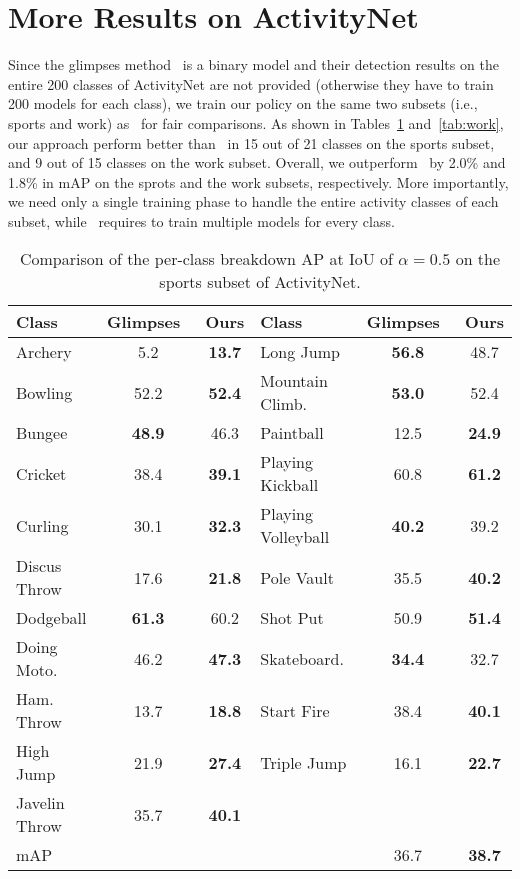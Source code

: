 \documentclass{bmvc2k}
\begin{document}
\section{More Results on ActivityNet}
\label{sec:results}

Since the glimpses method~\cite{yeung2015end} is a binary model and their detection results on the entire 200 classes of ActivityNet are not provided (otherwise they have to train 200 models for each class), we train our policy on the same two subsets (i.e., sports and work) as~\cite{yeung2015end} for fair comparisons. As shown in Tables~\ref{tab:sports} and~\ref{tab:work}, our approach perform better than~\cite{yeung2015end} in 15 out of 21 classes on the sports subset, and 9 out of 15 classes on the work subset. Overall, we outperform~\cite{yeung2015end} by 2.0\% and 1.8\% in mAP on the sprots and the work subsets, respectively. More importantly, we need only a single training phase to handle the entire activity classes of each subset, while~\cite{yeung2015end} requires to train multiple models for every class.

\begin{table}[thb]
\small
	\centering
	\begin{tabular}{lcclcc}
		\toprule
		Class & Glimpses~\cite{yeung2015end} & Ours & Class & Glimpses~\cite{yeung2015end} & Ours\\
		\midrule
		Archery & 5.2 & \textbf{13.7} & Long Jump & \textbf{56.8} & 48.7\\
		Bowling & 52.2 & \textbf{52.4} & Mountain Climb. & \textbf{53.0} & 52.4\\
        Bungee & \textbf{48.9} & 46.3 & Paintball & 12.5 & \textbf{24.9}\\
        Cricket & 38.4 & \textbf{39.1} & Playing Kickball & 60.8 & \textbf{61.2}\\
        Curling & 30.1 & \textbf{32.3} & Playing Volleyball & \textbf{40.2} & 39.2\\
        Discus Throw & 17.6 & \textbf{21.8} & Pole Vault & 35.5 & \textbf{40.2}\\
        Dodgeball & \textbf{61.3} & 60.2 & Shot Put & 50.9 & \textbf{51.4}\\
        Doing Moto. & 46.2 & \textbf{47.3} & Skateboard. & \textbf{34.4} & 32.7\\
		Ham. Throw & 13.7 & \textbf{18.8} & Start Fire & 38.4 & \textbf{40.1}\\
        High Jump & 21.9 & \textbf{27.4} & Triple Jump & 16.1 & \textbf{22.7}\\
        Javelin Throw & 35.7 & \textbf{40.1} & & & \\
        \midrule
        mAP & & & & 36.7 & \textbf{38.7}\\
		\bottomrule 
	\end{tabular}
	\vspace{10pt}
	\caption{Comparison of the per-class breakdown AP at IoU of $\alpha = 0.5$ on the sports subset of ActivityNet.}
	\label{tab:sports}
\end{table}
\end{document}
